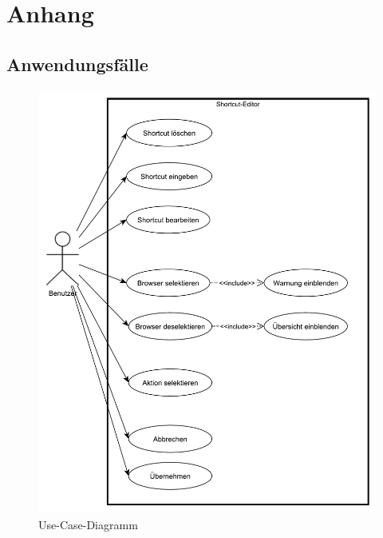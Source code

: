 \section{Anhang}

\subsection{Anwendungsfälle}

\vfill
\begin{figure}[H]
	\centering
	\includegraphics[width=\linewidth]{../graphic/diagrams/UC_Anwendungsfall/Anwendungsfall}
	\caption{Use-Case-Diagramm}
	\label{fig:anwendungsfall}
\end{figure}
\vfill

\newpage


